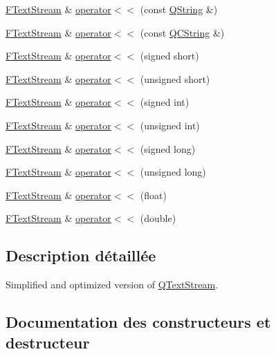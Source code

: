 \begin{DoxyCompactItemize}
\hyperlink{class_f_text_stream}{F\+Text\+Stream} \& \hyperlink{class_f_text_stream_a3468149d96ec2ed0918cd8aa7ced0ab3}{operator$<$$<$} (const \hyperlink{class_q_string}{Q\+String} \&)
\item 
\hyperlink{class_f_text_stream}{F\+Text\+Stream} \& \hyperlink{class_f_text_stream_af06c3d6273c5c593220a0078823f946c}{operator$<$$<$} (const \hyperlink{class_q_c_string}{Q\+C\+String} \&)
\item 
\hyperlink{class_f_text_stream}{F\+Text\+Stream} \& \hyperlink{class_f_text_stream_a2a8f83186d0dcb7cf994eda59d8bbab2}{operator$<$$<$} (signed short)
\item 
\hyperlink{class_f_text_stream}{F\+Text\+Stream} \& \hyperlink{class_f_text_stream_a2483704185aab1fdcf304a70623e7f58}{operator$<$$<$} (unsigned short)
\item 
\hyperlink{class_f_text_stream}{F\+Text\+Stream} \& \hyperlink{class_f_text_stream_ab388dd16842bbd8fec91487a15c29959}{operator$<$$<$} (signed int)
\item 
\hyperlink{class_f_text_stream}{F\+Text\+Stream} \& \hyperlink{class_f_text_stream_a64956cc813b4f5bbc317615d0965672a}{operator$<$$<$} (unsigned int)
\item 
\hyperlink{class_f_text_stream}{F\+Text\+Stream} \& \hyperlink{class_f_text_stream_ae8876943f5020db14ffdd11231998ea6}{operator$<$$<$} (signed long)
\item 
\hyperlink{class_f_text_stream}{F\+Text\+Stream} \& \hyperlink{class_f_text_stream_a21fedd3e73094c26f818ca5a1f187666}{operator$<$$<$} (unsigned long)
\item 
\hyperlink{class_f_text_stream}{F\+Text\+Stream} \& \hyperlink{class_f_text_stream_a6c4c40d944c49b1110a8dedc2b1a265e}{operator$<$$<$} (float)
\item 
\hyperlink{class_f_text_stream}{F\+Text\+Stream} \& \hyperlink{class_f_text_stream_af1dd4f6a0044885898df476168e92a7f}{operator$<$$<$} (double)
\end{DoxyCompactItemize}


\subsection{Description détaillée}
Simplified and optimized version of \hyperlink{class_q_text_stream}{Q\+Text\+Stream}. 

\subsection{Documentation des constructeurs et destructeur}
\hypertarget{class_f_text_stream_a612e69bc2d0f44fd5bb8a56bffb5e16d}{}
